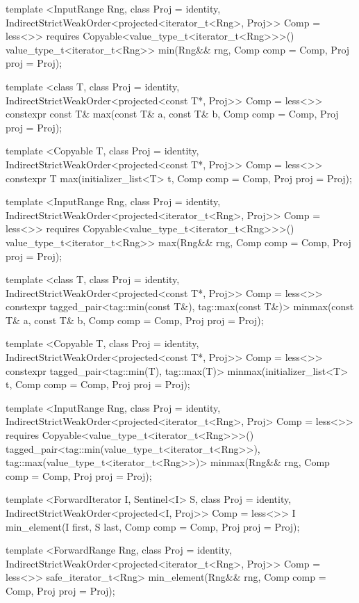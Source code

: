 \begin{codeblock}
{{{{  template <InputRange Rng, class Proj = identity,
      IndirectStrictWeakOrder<projected<iterator_t<Rng>, Proj>> Comp = less<>>
    requires Copyable<value_type_t<iterator_t<Rng>>>()
    value_type_t<iterator_t<Rng>>
      min(Rng&& rng, Comp comp = Comp{}, Proj proj = Proj{});

  template <class T, class Proj = identity,
      IndirectStrictWeakOrder<projected<const T*, Proj>> Comp = less<>>
    constexpr const T& max(const T& a, const T& b, Comp comp = Comp{}, Proj proj = Proj{});

  template <Copyable T, class Proj = identity,
      IndirectStrictWeakOrder<projected<const T*, Proj>> Comp = less<>>
    constexpr T max(initializer_list<T> t, Comp comp = Comp{}, Proj proj = Proj{});

  template <InputRange Rng, class Proj = identity,
      IndirectStrictWeakOrder<projected<iterator_t<Rng>, Proj>> Comp = less<>>
    requires Copyable<value_type_t<iterator_t<Rng>>>()
    value_type_t<iterator_t<Rng>>
      max(Rng&& rng, Comp comp = Comp{}, Proj proj = Proj{});

  template <class T, class Proj = identity,
      IndirectStrictWeakOrder<projected<const T*, Proj>> Comp = less<>>
    constexpr tagged_pair<tag::min(const T&), tag::max(const T&)>
      minmax(const T& a, const T& b, Comp comp = Comp{}, Proj proj = Proj{});

  template <Copyable T, class Proj = identity,
      IndirectStrictWeakOrder<projected<const T*, Proj>> Comp = less<>>
    constexpr tagged_pair<tag::min(T), tag::max(T)>
      minmax(initializer_list<T> t, Comp comp = Comp{}, Proj proj = Proj{});

  template <InputRange Rng, class Proj = identity,
      IndirectStrictWeakOrder<projected<iterator_t<Rng>, Proj> Comp = less<>>
    requires Copyable<value_type_t<iterator_t<Rng>>>()
    tagged_pair<tag::min(value_type_t<iterator_t<Rng>>),
                tag::max(value_type_t<iterator_t<Rng>>)>
      minmax(Rng&& rng, Comp comp = Comp{}, Proj proj = Proj{});

  template <ForwardIterator I, Sentinel<I> S, class Proj = identity,
      IndirectStrictWeakOrder<projected<I, Proj>> Comp = less<>>
    I min_element(I first, S last, Comp comp = Comp{}, Proj proj = Proj{});

  template <ForwardRange Rng, class Proj = identity,
      IndirectStrictWeakOrder<projected<iterator_t<Rng>, Proj>> Comp = less<>>
    safe_iterator_t<Rng>
      min_element(Rng&& rng, Comp comp = Comp{}, Proj proj = Proj{});

}}}}
\end{codeblock}
